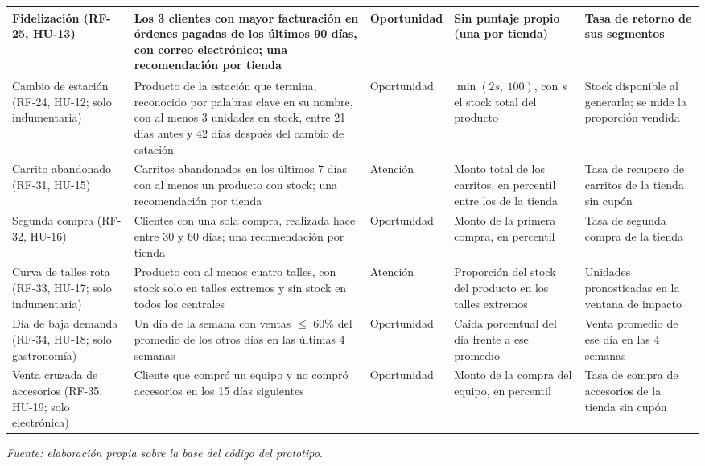 {\begin{longtable}{|>{\raggedright\arraybackslash}m{2.2cm}|>{\raggedright\arraybackslash}m{4.1cm}|>{\raggedright\arraybackslash}m{2.6cm}|>{\raggedright\arraybackslash}m{1.9cm}|>{\raggedright\arraybackslash}m{2.4cm}|}
\hline
Fidelización (RF-25, HU-13) & Los 3 clientes con mayor facturación en órdenes pagadas de los últimos 90 días, con correo electrónico; una recomendación por tienda & Oportunidad & Sin puntaje propio (una por tienda) &
Tasa de retorno de sus segmentos \\
\hline
Cambio de estación (RF-24, HU-12; solo indumentaria) & Producto de la estación que termina, reconocido por palabras clave en su nombre, con al menos 3 unidades en stock, entre 21 días antes y 42 días después del cambio de estación & Oportunidad & $\min(2s,\ 100)$, con $s$ el stock total del producto & Stock disponible al generarla; se mide la proporción vendida \\
\hline
Carrito abandonado (RF-31, HU-15) & Carritos abandonados en los últimos 7 días con al menos un producto con stock; una recomendación por tienda & Atención & Monto total de los carritos, en percentil entre los de la tienda & Tasa de recupero de carritos de la tienda sin cupón \\
\hline
Segunda compra (RF-32, HU-16) & Clientes con una sola compra, realizada hace entre 30 y 60 días; una recomendación por tienda & Oportunidad & Monto de la primera compra, en percentil & Tasa de segunda compra de la tienda \\
\hline
Curva de talles rota (RF-33, HU-17; solo indumentaria) & Producto con al menos cuatro talles, con stock solo en talles extremos y sin stock en todos los centrales & Atención & Proporción del stock del producto en los talles extremos & Unidades pronosticadas en la ventana de impacto \\
\hline
Día de baja demanda (RF-34, HU-18; solo gastronomía) & Un día de la semana con ventas $\le$ 60\% del promedio de los otros días en las últimas 4 semanas & Oportunidad & Caída porcentual del día frente a ese promedio & Venta promedio de ese día en las 4 semanas \\
\hline
Venta cruzada de accesorios (RF-35, HU-19; solo electrónica) & Cliente que compró un equipo y no compró accesorios en los 15 días siguientes & Oportunidad & Monto de la compra del equipo, en percentil & Tasa de compra de accesorios de la tienda sin cupón \\
\hline
\end{longtable}}

\vspace{-\baselineskip}
{\centering\footnotesize\textit{Fuente: elaboración propia sobre la base del código del prototipo.}\par}

